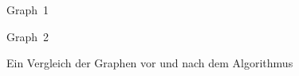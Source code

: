 \documentclass{scrartcl}
\begin{document}
	\begin{figure}[htbp] %
		\vspace{0pt} %
		\centering
		\begin{minipage}{6 cm}  %
			\centering\mbox{Graph 1} %
			\label{graph1:label} %
		\end{minipage}
		\begin{minipage}{6 cm} %
			\centering\mbox{Graph 2}
			\label{graph2:label}
		\end{minipage}
		\vspace{2cm}
		\caption{Ein Vergleich der Graphen vor und nach dem Algorithmus} %
	\end{figure}
\end{document}
